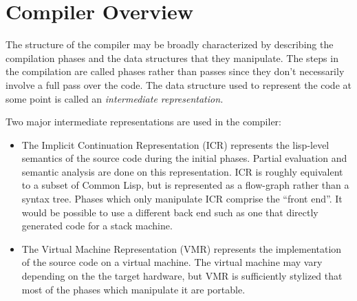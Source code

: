 \chapter{Compiler Overview} %

The structure of the compiler may be broadly characterized by describing the
compilation phases and the data structures that they manipulate.  The steps in
the compilation are called phases rather than passes since they don't
necessarily involve a full pass over the code.  The data structure used to
represent the code at some point is called an {\it intermediate
representation.}

Two major intermediate representations are used in the compiler:
\begin{itemize}

\item The Implicit Continuation Representation (ICR) represents the lisp-level
semantics of the source code during the initial phases.  Partial evaluation and
semantic analysis are done on this representation.  ICR is roughly equivalent
to a subset of Common Lisp, but is represented as a flow-graph rather than a
syntax tree.  Phases which only manipulate ICR comprise the ``front end''.  It
would be possible to use a different back end such as one that directly
generated code for a stack machine.

\item The Virtual Machine Representation (VMR) represents the implementation of
the source code on a virtual machine.  The virtual machine may vary depending
on the the target hardware, but VMR is sufficiently stylized that most of the
phases which manipulate it are portable.
\end{itemize}

